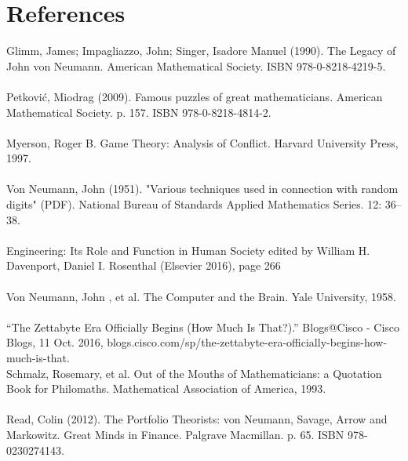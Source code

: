 \documentclass[12pt]{article}
\begin{document}
\pagebreak	
	
\section*{References}
Glimm, James; Impagliazzo, John; Singer, Isadore Manuel (1990). The Legacy of John von Neumann. American Mathematical Society. ISBN 978-0-8218-4219-5.\\
\\
Petković, Miodrag (2009). Famous puzzles of great mathematicians. American Mathematical Society. p. 157. ISBN 978-0-8218-4814-2.\\
\\
Myerson, Roger B. Game Theory: Analysis of Conflict. Harvard University Press, 1997.\\
\\
Von Neumann, John (1951). "Various techniques used in connection with random digits" (PDF). National Bureau of Standards Applied Mathematics Series. 12: 36–38.\\
\\
Engineering: Its Role and Function in Human Society edited by William H. Davenport, Daniel I. Rosenthal (Elsevier 2016), page 266\\
\\
Von Neumann, John , et al. The Computer and the Brain. Yale University, 1958.\\
\\
“The Zettabyte Era Officially Begins (How Much Is That?).” Blogs@Cisco - Cisco Blogs, 11 Oct. 2016, blogs.cisco.com/sp/the-zettabyte-era-officially-begins-how-much-is-that.
\\
Schmalz, Rosemary, et al. Out of the Mouths of Mathematicians: a Quotation Book for Philomaths. Mathematical Association of America, 1993.\\
\\
Read, Colin (2012). The Portfolio Theorists: von Neumann, Savage, Arrow and Markowitz. Great Minds in Finance. Palgrave Macmillan. p. 65. ISBN 978-0230274143. \\


	                              
\end{document}
